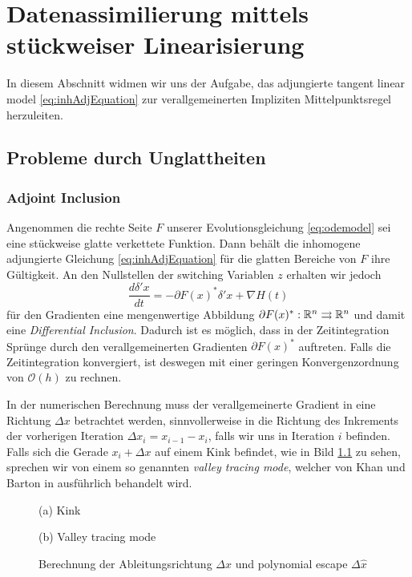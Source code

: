 % 
\chapter{Datenassimilierung mittels stückweiser Linearisierung}
In diesem Abschnitt widmen wir uns der Aufgabe, das adjungierte tangent linear model \eqref{eq:inhAdjEquation} zur verallgemeinerten Impliziten Mittelpunktsregel herzuleiten.
\section{Probleme durch Unglattheiten}
\subsection{Adjoint Inclusion}
Angenommen die rechte Seite $F$ unserer Evolutionsgleichung \eqref{eq:odemodel} sei eine stückweise glatte verkettete Funktion. Dann behält die inhomogene adjungierte Gleichung \eqref{eq:inhAdjEquation} für die glatten Bereiche von $F$ ihre Gültigkeit. An den Nullstellen der switching Variablen $z$ erhalten wir jedoch
\begin{equation}
 \label{eq:adjInclusion}
 \frac{d \delta' x}{dt} =- \partial F(x)^*\delta'x + \nabla H(t)
\end{equation}
für den Gradienten eine mengenwertige Abbildung $\partial F(x)^*:\mathbb{R}^n\rightrightarrows \mathbb{R}^n$ und damit eine \textit{Differential Inclusion}.
Dadurch ist es möglich, dass in der Zeitintegration Sprünge durch den verallgemeinerten Gradienten $\partial F(x)^*$ auftreten. Falls die Zeitintegration konvergiert, ist deswegen mit einer geringen Konvergenzordnung von $\mathcal O(h)$ zu rechnen.

In der numerischen Berechnung muss der verallgemeinerte Gradient in eine Richtung $\Delta x$ betrachtet werden, sinnvollerweise in die Richtung des Inkrements der vorherigen Iteration $\Delta x_i = x_{i-1} - x_i$, falls wir uns in Iteration $i$ befinden. 
Falls sich die Gerade $x_i + \Delta x$ auf einem Kink befindet, wie in Bild \ref{fig:adjValleyTracing} zu sehen, sprechen wir von einem so genannten \textit{valley tracing mode}, welcher von Khan und Barton in \cite{khan2014} ausführlich behandelt wird. 
\begin{figure}
\begin{minipage}[b]{0.49\linewidth}
\centering

\caption*{(a) Kink}
\end{minipage}
\begin{minipage}[b]{0.49\linewidth}
\centering

\caption*{(b) Valley tracing mode}
\end{minipage}
\caption{Berechnung der Ableitungsrichtung $\Delta x$ und polynomial escape $\Delta \hat x$ }
\label{fig:adjValleyTracing}
\end{figure}


